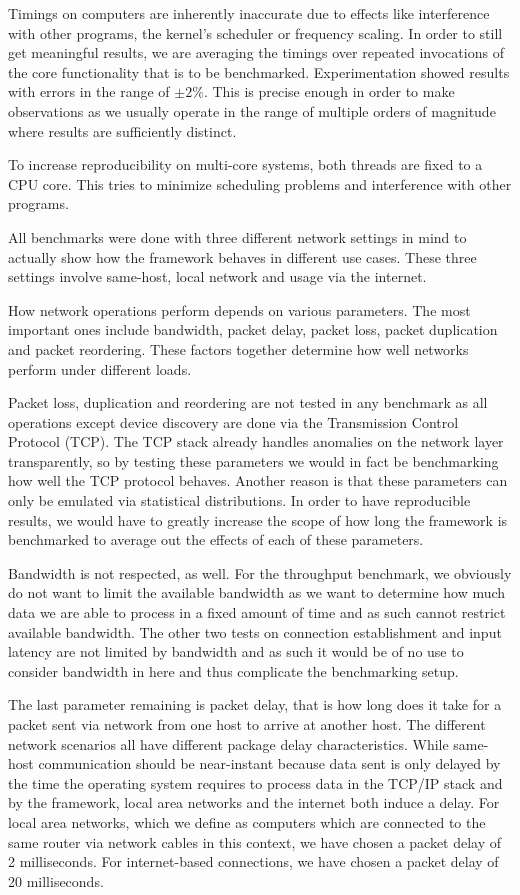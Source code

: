 Timings on computers are inherently inaccurate due to effects like interference with other programs, the kernel's scheduler or frequency scaling.
In order to still get meaningful results, we are averaging the timings over repeated invocations of the core functionality that is to be benchmarked.
Experimentation showed results with errors in the range of $\pm2\%$.
This is precise enough in order to make observations as we usually operate in the range of multiple orders of magnitude where results are sufficiently distinct.

To increase reproducibility on multi-core systems, both threads are fixed to a CPU core.
This tries to minimize scheduling problems and interference with other programs.

\medskip

All benchmarks were done with three different network settings in mind to actually show how the framework behaves in different use cases.
These three settings involve same-host, local network and usage via the internet.

How network operations perform depends on various parameters.
The most important ones include bandwidth, packet delay, packet loss, packet duplication and packet reordering.
These factors together determine how well networks perform under different loads.

Packet loss, duplication and reordering are not tested in any benchmark as all operations except device discovery are done via the Transmission Control Protocol (TCP).
The TCP stack already handles anomalies on the network layer transparently, so by testing these parameters we would in fact be benchmarking how well the TCP protocol behaves.
Another reason is that these parameters can only be emulated via statistical distributions.
In order to have reproducible results, we would have to greatly increase the scope of how long the framework is benchmarked to average out the effects of each of these parameters.

Bandwidth is not respected, as well.
For the throughput benchmark, we obviously do not want to limit the available bandwidth as we want to determine how much data we are able to process in a fixed amount of time and as such cannot restrict available bandwidth.
The other two tests on connection establishment and input latency are not limited by bandwidth and as such it would be of no use to consider bandwidth in here and thus complicate the benchmarking setup.

The last parameter remaining is packet delay, that is how long does it take for a packet sent via network from one host to arrive at another host.
The different network scenarios all have different package delay characteristics.
While same-host communication should be near-instant because data sent is only delayed by the time the operating system requires to process data in the TCP/IP stack and by the framework, local area networks and the internet both induce a delay.
For local area networks, which we define as computers which are connected to the same router via network cables in this context, we have chosen a packet delay of 2 milliseconds.
For internet-based connections, we have chosen a packet delay of 20 milliseconds.

